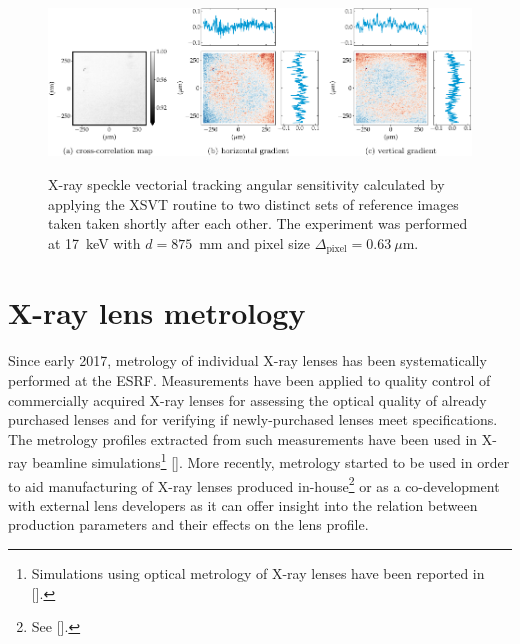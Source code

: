 \begin{refsection}
\begin{figure}[t]
        \centering
        {\includegraphics[width=0.875\linewidth]{figures/ch04b/sensitivity_3b.pdf}}
        \caption[XSVT experimental sensitivity calculation]{X-ray speckle vectorial tracking angular sensitivity calculated by applying the XSVT routine to two distinct sets of reference images taken taken shortly after each other. The experiment was performed at 17~keV with $d=875$~mm and pixel size $\Delta_\text{pixel}= 0.63~\mu$m.}\label{fig:sensitivity_3}
\end{figure}
\section{X-ray lens metrology}\label{sec:metrology}

Since early 2017, metrology of individual X-ray lenses has been systematically performed at the ESRF. Measurements have been applied to quality control of commercially acquired X-ray lenses for assessing the optical quality of already purchased lenses and for verifying if newly-purchased lenses meet specifications. The metrology profiles extracted from such measurements have been used in X-ray beamline simulations\footnote{Simulations using optical metrology of X-ray lenses have been reported in [\cite{Chubar2020}].} [\cite{Celestre2020}]. More recently, metrology started to be used in order to aid manufacturing of X-ray lenses produced in-house\footnote{See [\cite{Celestre2020c}].} or as a co-development with external lens developers as it can offer insight into the relation between production parameters and their effects on the lens profile.


\end{refsection}
